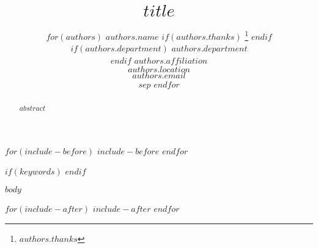 \documentclass{article}
\title{$title$}
\author{
  $for(authors)$
  $authors.name$
  $if(authors.thanks)$
  \thanks{$authors.thanks$}
  $endif$ \\
  $if(authors.department)$
  $authors.department$ \\
  $endif$
  $authors.affiliation$ \\
  $authors.location$ \\
  \texttt{$authors.email$} \\
  $sep$ \And
  $endfor$
}
\begin{document}
\maketitle

\def\tightlist{}

$for(include-before)$
$include-before$
$endfor$

\begin{abstract}
$abstract$
\end{abstract}

$if(keywords)$
$endif$

$body$




$for(include-after)$
$include-after$
$endfor$
\end{document}
